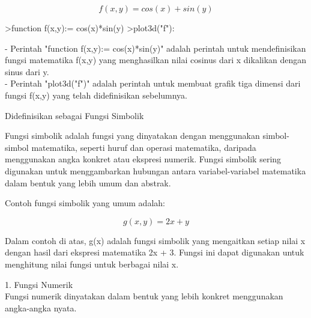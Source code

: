 \documentclass[a4paper,10pt]{article}
\begin{document}
\begin{eulernotebook}
\begin{eulercomment}
\begin{eulercomment}
\begin{eulercomment}
\begin{eulercomment}
\begin{eulercomment}
\begin{eulercomment}
\begin{eulercomment}
\begin{eulercomment}
\begin{eulercomment}
\end{eulercomment}
\begin{eulerformula}
\[
f(x,y)=cos(x)+sin(y)
\]
\end{eulerformula}
\begin{eulerprompt}
>function f(x,y):= cos(x)*sin(y)
>plot3d("f"):
\end{eulerprompt}
\begin{eulercomment}
- Perintah "function f(x,y):= cos(x)*sin(y)" adalah perintah untuk
mendefinisikan fungsi matematika f(x,y) yang menghasilkan nilai
cosinus dari x dikalikan dengan sinus dari y.\\
- Perintah "plot3d("f")" adalah perintah untuk membuat grafik tiga
dimensi dari fungsi f(x,y) yang telah didefinisikan sebelumnya.



\end{eulercomment}
\begin{eulercomment}
Didefinisikan sebagai Fungsi Simbolik

\end{eulercomment}
\begin{eulercomment}
Fungsi simbolik adalah fungsi yang dinyatakan dengan menggunakan
simbol-simbol matematika, seperti huruf dan operasi matematika,
daripada menggunakan angka konkret atau ekspresi numerik. Fungsi
simbolik sering digunakan untuk menggambarkan hubungan antara
variabel-variabel matematika dalam bentuk yang lebih umum dan abstrak.

Contoh fungsi simbolik yang umum adalah:

\end{eulercomment}
\begin{eulerformula}
\[
g(x,y) = 2x + y
\]
\end{eulerformula}
\begin{eulercomment}
Dalam contoh di atas, g(x) adalah fungsi simbolik yang mengaitkan
setiap nilai x dengan hasil dari ekspresi matematika 2x + 3. Fungsi
ini dapat digunakan untuk menghitung nilai fungsi untuk berbagai nilai
x.

\end{eulercomment}
\begin{eulercomment}
1. Fungsi Numerik\\
Fungsi numerik dinyatakan dalam bentuk yang lebih konkret menggunakan
angka-angka nyata.


\end{eulercomment}
\end{eulercomment}
\end{eulercomment}
\end{eulercomment}
\end{eulercomment}
\end{eulercomment}
\end{eulercomment}
\end{eulercomment}
\end{eulercomment}
\end{eulernotebook}
\end{document}
